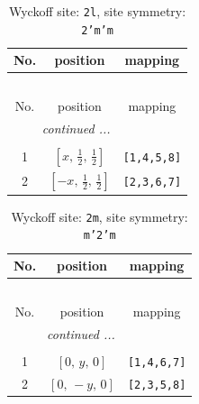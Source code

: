\documentclass[fleqn,8pt]{jsarticle}
\begin{document}
\renewcommand{\arraystretch}{1.2}
\begin{longtable}{ccc}
\caption{Wyckoff site: {\tt 2l}, site symmetry: {\tt 2'm'm}}
 \\
 \hline \hline
No. & position & mapping \\ \hline \endfirsthead

\multicolumn{2}{l}{\tablename\ \thetable{}} \\
 \hline \hline
No. & position & mapping \\ \hline \endhead

 \hline \hline
\multicolumn{2}{r}{\footnotesize\it continued ...} \\ \endfoot

 \hline \hline
\multicolumn{2}{r}{} \\ \endlastfoot

1 & $\left[ x,\, \frac{1}{2},\, \frac{1}{2} \right]$ & {\tt [1,4,5,8]} \\ \hline
2 & $\left[ - x,\, \frac{1}{2},\, \frac{1}{2} \right]$ & {\tt [2,3,6,7]} \\
\end{longtable}
\renewcommand{\arraystretch}{1.2}
\begin{longtable}{ccc}
\caption{Wyckoff site: {\tt 2m}, site symmetry: {\tt m'2'm}}
 \\
 \hline \hline
No. & position & mapping \\ \hline \endfirsthead

\multicolumn{2}{l}{\tablename\ \thetable{}} \\
 \hline \hline
No. & position & mapping \\ \hline \endhead

 \hline \hline
\multicolumn{2}{r}{\footnotesize\it continued ...} \\ \endfoot

 \hline \hline
\multicolumn{2}{r}{} \\ \endlastfoot

1 & $\left[ 0,\, y,\, 0 \right]$ & {\tt [1,4,6,7]} \\ \hline
2 & $\left[ 0,\, - y,\, 0 \right]$ & {\tt [2,3,5,8]} \\
\end{longtable}
\renewcommand{\arraystretch}{1.2}
\end{document}
